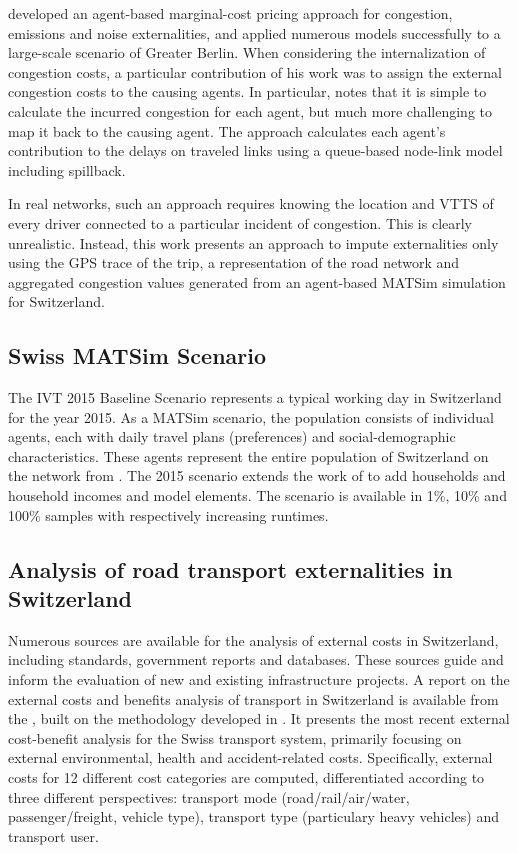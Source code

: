 \label{section:kaddoura_congestion_approach}
\citet{kaddoura2015marginal} developed an agent-based marginal-cost pricing approach for congestion, emissions and noise externalities, and applied numerous models successfully to a large-scale scenario of Greater Berlin.
When considering the internalization of congestion costs, a particular contribution of his work was to assign the external congestion costs to the causing agents.
In particular, \citet{kaddoura2015marginal} notes that it is simple to calculate the incurred congestion for each agent, but much more challenging to map it back to the causing agent.
The approach calculates each agent's contribution to the delays on traveled links using a queue-based node-link model including spillback.

In real networks, such an approach requires knowing the location and VTTS of every driver connected to a particular incident of congestion.
This is clearly unrealistic.
Instead, this work presents an approach to impute externalities only using the GPS trace of the trip, a representation of the road network and aggregated congestion values generated from an agent-based MATSim simulation for Switzerland.

\subsection{Swiss MATSim Scenario}
\label{section:matsim-scenario}
The IVT 2015 Baseline Scenario \citep{bosch2016ivt} represents a typical working day in Switzerland for the year 2015.
As a MATSim scenario, the population consists of individual agents, each with daily travel plans (preferences) and social-demographic characteristics.
These agents represent the entire population of Switzerland on the network from \citet{bosch2015multi}.
The 2015 scenario extends the work of \citet{balmer2006agent} to add households and household incomes and model elements.
The scenario is available in 1\%, 10\% and 100\% samples with respectively increasing runtimes.

\subsection{Analysis of road transport externalities in Switzerland} %

Numerous sources are available for the analysis of external costs in Switzerland, including standards, government reports and databases.
These sources guide and inform the evaluation of new and existing infrastructure projects.
A report on the external costs and benefits analysis of transport in Switzerland is available from the \citet{are2016externalcosts}, built on the methodology developed in \citet{ecoplaninfras2014externeeffekte}.
It presents the most recent external cost-benefit analysis for the Swiss transport system, primarily focusing on external environmental, health and accident-related costs.
Specifically, external costs for 12 different cost categories are computed, differentiated according to three different perspectives: transport mode (road/rail/air/water, passenger/freight, vehicle type), transport type (particulary heavy vehicles) and transport user.


